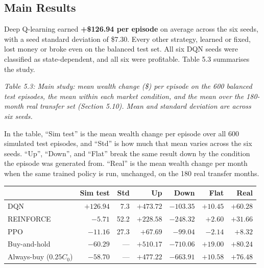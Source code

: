 \subsection{Main Results}

Deep Q-learning earned \textbf{+\$126.94 per episode} on average across
the six seeds, with a seed standard deviation of \$7.30. Every other
strategy, learned or fixed, lost money or broke even on the balanced
test set. All six DQN seeds were classified as state-dependent, and all
six were profitable. Table 5.3 summarises the study.

\emph{Table 5.3: Main study: mean wealth change (\$) per episode on the
600 balanced test episodes, the mean within each market condition, and
the mean over the 180-month real transfer set (Section 5.10). Mean and
standard deviation are across six seeds.}

In the table, ``Sim test'' is the mean wealth change per episode over
all 600 simulated test episodes, and ``Std'' is how much that mean
varies across the six seeds. ``Up'', ``Down'', and ``Flat'' break the
same result down by the condition the episode was generated from.
``Real'' is the mean wealth change per month when the same trained
policy is run, unchanged, on the 180 real transfer months.

{\def\LTcaptype{none}
\begin{longtable}[]{@{}lrrrrrr@{}}
\toprule\noalign{}
 & \textbf{Sim test} & \textbf{Std} & \textbf{Up} & \textbf{Down} &
\textbf{Flat} & \textbf{Real} \\
\midrule\noalign{}
\endhead
\bottomrule\noalign{}
\endlastfoot
DQN        & \(+126.94\) & 7.3  & \(+473.72\) & \(-103.35\) & \(+10.45\) & \(+60.28\) \\
REINFORCE  & \(-5.71\)   & 52.2 & \(+228.58\) & \(-248.32\) & \(+2.60\)  & \(+31.66\)  \\
PPO        & \(-11.16\)  & 27.3 & \(+67.69\)  & \(-99.04\)  & \(-2.14\)  & \(+8.32\)  \\
Buy-and-hold           & \(-60.29\) & --- & \(+510.17\) & \(-710.06\) & \(+19.00\) & \(+80.24\) \\
Always-buy (\(0.25C_{0}\)) & \(-58.70\) & --- & \(+477.22\) & \(-663.91\) & \(+10.58\) & \(+76.48\) \\
\end{longtable}
}

